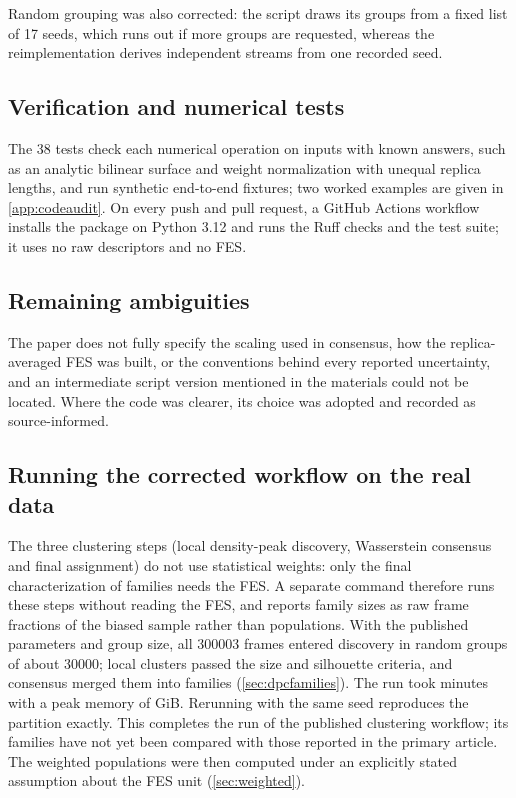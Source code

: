 Random grouping was also corrected: the script draws its groups from a fixed list of 17 seeds, which runs out if more groups are requested, whereas the reimplementation derives independent streams from one recorded seed.

\subsection{Verification and numerical tests}
The 38 tests check each numerical operation on inputs with known answers, such as an analytic bilinear surface and weight normalization with unequal replica lengths, and run synthetic end-to-end fixtures; two worked examples are given in \cref{app:codeaudit}. On every push and pull request, a GitHub Actions workflow installs the package on Python 3.12 and runs the Ruff checks and the test suite; it uses no raw descriptors and no FES.

\subsection{Remaining ambiguities}
The paper does not fully specify the scaling used in consensus, how the replica-averaged FES was built, or the conventions behind every reported uncertainty, and an intermediate script version mentioned in the materials could not be located. Where the code was clearer, its choice was adopted and recorded as source-informed.

\subsection{Running the corrected workflow on the real data}
\label{sec:dpcrun}
The three clustering steps (local density-peak discovery, Wasserstein consensus and final assignment) do not use statistical weights: only the final characterization of families needs the FES. A separate  command therefore runs these steps without reading the FES, and reports family sizes as raw frame fractions of the biased sample rather than populations. With the published parameters and group size, all \num{300003} frames entered discovery in \DPCGroups{} random groups of about \num{30000}; \DPCLocalClusters{} local clusters passed the size and silhouette criteria, and consensus merged them into \DPCFamilies{} families (\cref{sec:dpcfamilies}). The run took \DPCMinutes{} minutes with a peak memory of \DPCMemory{} GiB. Rerunning with the same seed reproduces the partition exactly. This completes the run of the published clustering workflow; its families have not yet been compared with those reported in the primary article. The weighted populations were then computed under an explicitly stated assumption about the FES unit (\cref{sec:weighted}).

